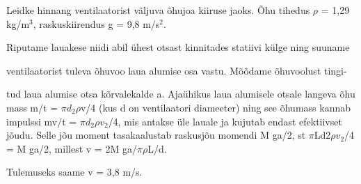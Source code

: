 
Leidke hinnang ventilaatorist väljuva õhujoa kiiruse jaoks. Õhu tihedus $\rho$ = 1,29 kg/m$^3$, raskuskiirendus g = 9,8 m/s$^2$.

\hint

\solu
Riputame lauakese niidi abil ühest otsast kinnitades statiivi külge ning suuname

ventilaatorist tuleva õhuvoo laua alumise osa vastu. Mõõdame õhuvoolust tingi-

tud laua alumise otsa kõrvalekalde a. Ajaühikus laua alumisele otsale langeva õhu mass m/t = $\pi$$d_2$$\rho$v/4 (kus d on ventilaatori diameeter) ning see õhumass kannab impulssi mv/t = $\pi$$d_2$$\rho$$v_2$/4, mis antakse üle lauale ja kujutab endast efektiivset jõudu. Selle jõu moment tasakaalustab raskusjõu momendi M ga/2, st $\pi$Ld2$\rho$$v_2$/4 = M ga/2, millest v = 2M ga/$\pi\rho$L/d.

Tulemuseks saame v = 3,8 m/s.
\probend
